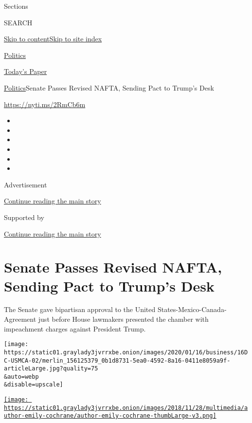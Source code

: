 Sections

SEARCH

\protect\hyperlink{site-content}{Skip to
content}\protect\hyperlink{site-index}{Skip to site index}

\href{https://www.nytimes3xbfgragh.onion/section/politics}{Politics}

\href{https://myaccount.nytimes3xbfgragh.onion/auth/login?response_type=cookie\&client_id=vi}{}

\href{https://www.nytimes3xbfgragh.onion/section/todayspaper}{Today's
Paper}

\href{/section/politics}{Politics}\textbar{}Senate Passes Revised NAFTA,
Sending Pact to Trump's Desk

\url{https://nyti.ms/2RmCb6m}

\begin{itemize}
\item
\item
\item
\item
\item
\item
\end{itemize}

Advertisement

\protect\hyperlink{after-top}{Continue reading the main story}

Supported by

\protect\hyperlink{after-sponsor}{Continue reading the main story}

\hypertarget{senate-passes-revised-nafta-sending-pact-to-trumps-desk}{%
\section{Senate Passes Revised NAFTA, Sending Pact to Trump's
Desk}\label{senate-passes-revised-nafta-sending-pact-to-trumps-desk}}

The Senate gave bipartisan approval to the United
States-Mexico-Canada-Agreement just before House lawmakers presented the
chamber with impeachment charges against President Trump.

\texttt{[image: https://static01.graylady3jvrrxbe.onion/images/2020/01/16/business/16DC-USMCA-02/merlin\_156125379\_0b1d8731-5ea0-4592-8a16-0411e8059a9f-articleLarge.jpg?quality=75\\\&auto=webp\\\&disable=upscale]}

\href{https://www.nytimes3xbfgragh.onion/by/emily-cochrane}{\texttt{[image: https://static01.graylady3jvrrxbe.onion/images/2018/11/28/multimedia/author-emily-cochrane/author-emily-cochrane-thumbLarge-v3.png]}}

